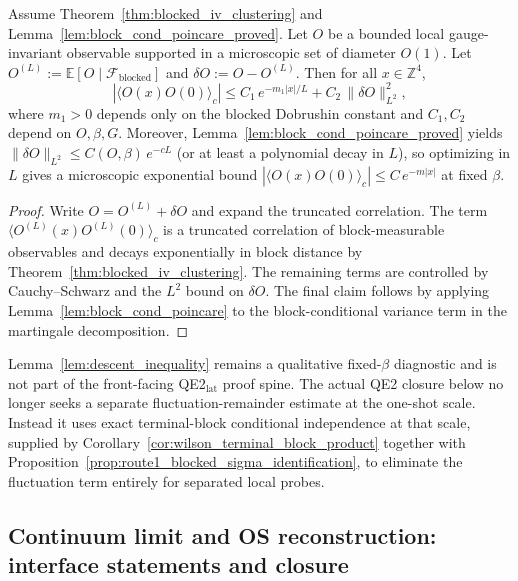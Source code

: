 \begin{lemma}\label{lem:descent_inequality}
Assume Theorem~\ref{thm:blocked_iv_clustering} and Lemma~\ref{lem:block_cond_poincare_proved}.
Let $O$ be a bounded local gauge-invariant observable supported in a microscopic set of diameter $O(1)$.
Let $O^{(L)}:=\mathbb E[O\mid \mathcal F_{\mathrm{blocked}}]$ and $\delta O:=O-O^{(L)}$.
Then for all $x\in\mathbb Z^4$,
\[
|\langle O(x)O(0)\rangle_c|
\le
C_1\,e^{-m_1 |x|/L}
+
C_2\,\|\delta O\|_{L^2}^2,
\]
where $m_1>0$ depends only on the blocked Dobrushin constant and $C_1,C_2$ depend on $O,\beta,G$.
Moreover, Lemma~\ref{lem:block_cond_poincare_proved} yields $\|\delta O\|_{L^2}\le C(O,\beta)\,e^{-c L}$ (or at least
a polynomial decay in $L$), so optimizing in $L$ gives a microscopic exponential bound
$|\langle O(x)O(0)\rangle_c|\le C\,e^{-m |x|}$ at fixed $\beta$.
\end{lemma}

\begin{proof}
Write $O=O^{(L)}+\delta O$ and expand the truncated correlation.
The term $\langle O^{(L)}(x)O^{(L)}(0)\rangle_c$ is a truncated correlation of block-measurable observables and
decays exponentially in block distance by Theorem~\ref{thm:blocked_iv_clustering}.
The remaining terms are controlled by Cauchy--Schwarz and the $L^2$ bound on $\delta O$.
The final claim follows by applying Lemma~\ref{lem:block_cond_poincare} to the block-conditional variance term in the martingale decomposition.
\end{proof}

\begin{remark}
Lemma~\ref{lem:descent_inequality} remains a qualitative fixed-$\beta$ diagnostic and is not part of the front-facing QE2$_{\mathrm{lat}}$ proof spine.
The actual QE2 closure below no longer seeks a separate fluctuation-remainder estimate at the one-shot scale.
Instead it uses exact terminal-block conditional independence at that scale, supplied by Corollary~\ref{cor:wilson_terminal_block_product} together with Proposition~\ref{prop:route1_blocked_sigma_identification}, to eliminate the fluctuation term entirely for separated local probes.
\end{remark}


\subsection{Continuum limit and OS reconstruction: interface statements and closure}

